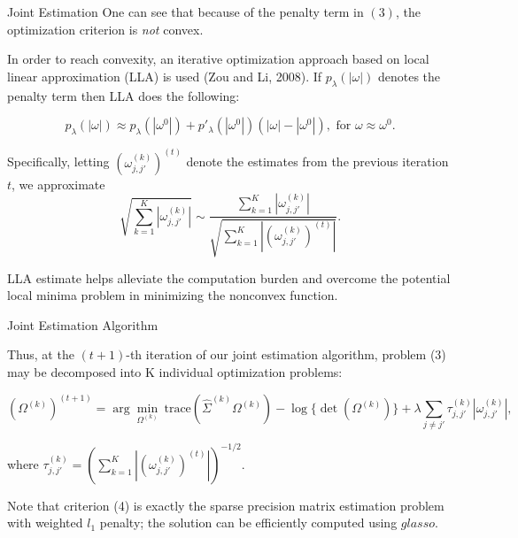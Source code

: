 \documentclass[t]{beamer}
\begin{document}
              \begin{frame}{Joint Estimation}
               One can see that because of the penalty term in $(3)$, the optimization criterion is \textit{not} convex.   
               \bigskip


               \pause
                In order to reach convexity, an iterative optimization approach based on local linear approximation (LLA) is used (Zou and Li, 2008). If $p_{\lambda}(|\omega|)$ denotes the penalty term then LLA does the following:
                        
                        \begin{equation*}p_{\lambda}(|\omega|) \approx p_{\lambda}(|\omega^0|) + p'_{\lambda}(|\omega^0|)(|\omega| - |\omega^0|), \mbox{ for } \omega \approx \omega^0. 
\end{equation*} 
                     
 \pause
                         Specifically, letting $(\omega^{(k)}_{j,j'})^{(t)}$
                   denote
                  the estimates from the previous iteration $t$, we approximate
            \begin{equation*}      
                 \sqrt{\sum_{k=1}^K |\omega_{j,j'}^{(k)}|} \sim \frac{\sum_{k=1}^K |\omega_{j,j'}^{(k)}|}{\sqrt{\sum_{k=1}^K |(\omega_{j,j'}^{(k)})^{(t)}|}}. 
\end{equation*}
                 \bigskip
\pause
                 
                  LLA estimate helps alleviate the computation burden 
                 and overcome the potential local minima problem in minimizing the nonconvex
                 function.
                
                
                 \end{frame}
                 
  
          \begin{frame}{Joint Estimation Algorithm}
             
             Thus, at the $(t+1)$-th iteration of our joint estimation algorithm, problem (3) may be decomposed into K individual optimization
             problems:
             
             
             \begin{equation}
             (\Omega^{(k)})^{(t+1)} = \arg \underset{\Omega^{(k)}}{\min} \ \mbox{trace}(\hat{\Sigma}^{(k)}  \Omega^{(k)}) - \log\{ \det(\Omega^{(k)})\} + \lambda \sum_{j \neq j'} \tau_{j,j'}^{(k)} |\omega_{j,j'}^{(k)}|,
             \end{equation}
             
             where $\tau_{j,j'}^{(k)} = (\sum_{k=1}^K |(\omega_{j,j'}^{(k)})^{(t)}|)^{-1/2}$.
             
             \bigskip
             \pause
              Note that criterion (4) is exactly the sparse precision
             matrix estimation problem with weighted $l_1$ penalty; the solution can be efficiently computed
             using $glasso$.
            
            
            \end{frame} 
            
\end{document}
